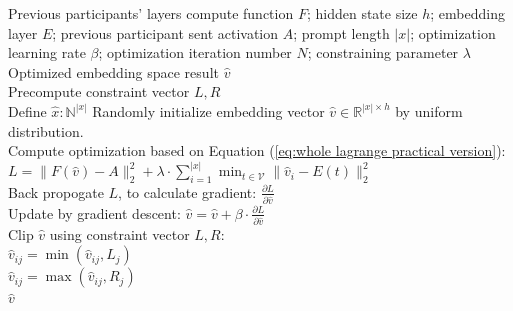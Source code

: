 \label{appendix:alg}
\begin{algorithm}[!h]
   \caption{\emph{Constrained Optimization}}
   \label{alg:optim}
\begin{algorithmic}
    Previous participants' layers compute function $F$;  hidden state size $h$; embedding layer $E$; previous participant sent activation $A$; prompt length $|x|$; optimization learning rate $\beta$; optimization iteration number $N$;   constraining parameter $\lambda$
   \\
      Optimized embedding space result $\hat{v}$\\
    \STATE Precompute constraint vector $L,R$\\
    \STATE Define $\hat{x}:\mathbb{N}^{|x|}$
    \STATE Randomly initialize  embedding vector $\hat{v}\in \mathbb{R}^{|x|\times h}$ by uniform distribution.\\
    \STATE Compute optimization based on Equation (\ref{eq:whole lagrange practical version}):\\
    \STATE $L=\|F(\hat{v})-A\|_2^2+ \lambda \cdot \sum_{i=1}^{|x|} \min_{t \in \mathcal{V}} \|\hat{v}_i -E(t) \|_2^2$\\
    \STATE Back propogate $L$, to calculate gradient: $\frac{\partial L}{\partial \hat{v}}$ \\
    \STATE Update by gradient descent: $\hat{v}=\hat{v}+\beta \cdot \frac{\partial L}{\partial \hat{v}}$ \\
    \STATE Clip $\hat{v}$ using constraint vector $L, R$:\\
    \STATE $\hat{v}_{ij}=\min (\hat{v}_{ij},L_j)$ \\
    \STATE $\hat{v}_{ij}=\max (\hat{v}_{ij},R_j)$ \\
    \ENDFOR
    \ENDFOR
    \ENDFOR
    \RETURN $\hat{v}$\\
   
\end{algorithmic}
\end{algorithm}


